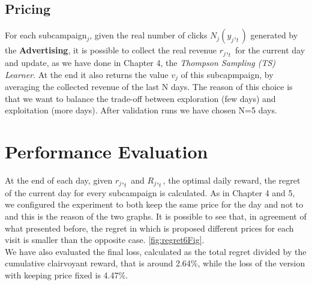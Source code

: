 \subsection{Pricing}
For each subcampaign$_j$, given the real number of clicks $ N_j(y_j,_t) $ generated by the \textbf{Advertising}, it is possible to collect the real revenue $ r_j,_t $ for the current day and update, as we have done in Chapter 4, the \textit{Thompson Sampling (TS) Learner}. At the end it also returns the value $ v_j $ of this subcapmpaign, by averaging the collected revenue of the last N days. The reason of this choice is that we want to balance the trade-off between exploration (few days) and exploitation (more days). After validation runs we have chosen N=5 days.


\section{Performance Evaluation}
At the end of each day, given $ r_j,_t $ and $ R_j,_t $, the optimal daily reward, the regret of the current day for every subcampaign is calculated. As in Chapter 4 and 5, we configured the experiment to both keep the same price for the day and not to and this is the reason of the two graphs. It is possible to see that, in agreement of what presented before, the regret in which is proposed different prices for each visit is smaller than the opposite case. \ref{fig:regret6Fig}.\\
We have also evaluated the final loss, calculated as the total regret divided by the cumulative clairvoyant reward, that is around 2.64\%, while the loss of the version with keeping price fixed is 4.47\%. \\

